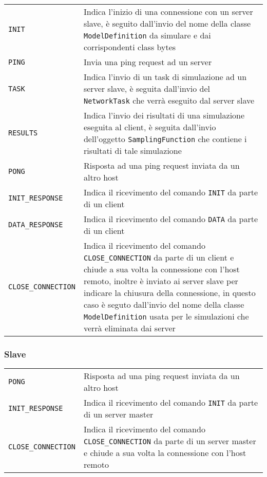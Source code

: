 \begin{table}[H]
    \begin{tabularx}{\linewidth}{ l X }
        \texttt{INIT} & Indica l'inizio di una connessione con un server slave, è seguito dall'invio del nome della classe \texttt{ModelDefinition} da simulare e dai corrispondenti class bytes \\
        \texttt{PING} & Invia una ping request ad un server \\
        \texttt{TASK} & Indica l'invio di un task di simulazione ad un server slave, è seguita dall'invio del \texttt{NetworkTask} che verrà eseguito dal server slave \\
        \texttt{RESULTS} & Indica l'invio dei risultati di una simulazione eseguita al client, è seguita dall'invio dell'oggetto \texttt{SamplingFunction} che contiene i risultati di tale simulazione \\
        \texttt{PONG} & Risposta ad una ping request inviata da un altro host \\
        \texttt{INIT\_RESPONSE} & Indica il ricevimento del comando \texttt{INIT} da parte di un client \\
        \texttt{DATA\_RESPONSE} & Indica il ricevimento del comando \texttt{DATA} da parte di un client\\
        \texttt{CLOSE\_CONNECTION} & Indica il ricevimento del comando \texttt{CLOSE\_CONNECTION} da parte di un client e chiude a sua volta la connessione con l'host remoto, inoltre è inviato ai server slave per indicare la chiusura della connessione, in questo caso è seguto dall'invio del nome della classe \texttt{ModelDefinition} usata per le simulazioni che verrà eliminata dai server
    \end{tabularx}
\end{table}

\subsubsection{Slave}

\begin{table}[H]
    \begin{tabularx}{\linewidth}{ l X }
        \texttt{PONG} & Risposta ad una ping request inviata da un altro host \\
        \texttt{INIT\_RESPONSE} & Indica il ricevimento del comando \texttt{INIT} da parte di un server master \\
        \texttt{CLOSE\_CONNECTION} & Indica il ricevimento del comando \texttt{CLOSE\_CONNECTION} da parte di un server master e chiude a sua volta la connessione con l'host remoto \\
    \end{tabularx}
\end{table}

